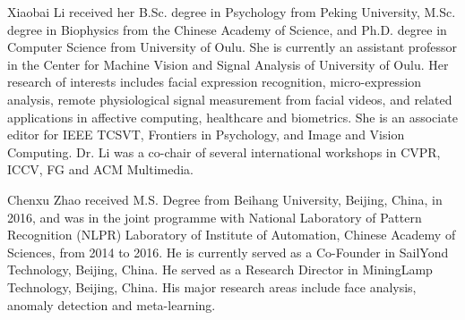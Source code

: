 \documentclass[10pt,journal,compsoc]{IEEEtran}
\begin{document}
\begin{IEEEbiography}{Xiaobai Li}
received her B.Sc. degree in Psychology from Peking University, M.Sc. degree in Biophysics from the Chinese Academy of Science, and Ph.D. degree in Computer Science from University of Oulu. She is currently an assistant professor in the Center for Machine Vision and Signal Analysis of University of Oulu. Her research of interests includes facial expression recognition, micro-expression analysis, remote physiological signal measurement from facial videos, and related applications in affective computing, healthcare and biometrics. She is an associate editor for IEEE TCSVT, Frontiers in Psychology, and Image and Vision Computing. Dr. Li was a co-chair of several international workshops in CVPR, ICCV, FG and ACM Multimedia. 
\end{IEEEbiography}


	
\begin{IEEEbiography}{Chenxu Zhao}
 received M.S. Degree from Beihang University, Beijing, China, in 2016, and was in the joint programme with National Laboratory of Pattern Recognition (NLPR) Laboratory of Institute of Automation, Chinese Academy of Sciences, from 2014 to 2016.
 He is currently served as a Co-Founder in SailYond Technology, Beijing, China.
 He served as a Research Director in MiningLamp Technology, Beijing, China. 
 His major research areas include face analysis, anomaly detection and meta-learning.
\end{IEEEbiography}


\end{document}
